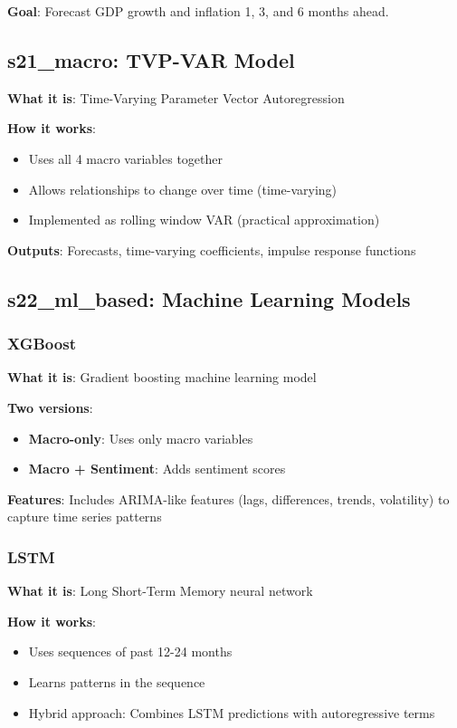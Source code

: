 \documentclass[11pt,a4paper]{article}
\begin{document}
\textbf{Goal}: Forecast GDP growth and inflation 1, 3, and 6 months ahead.

\subsection{s21\_macro: TVP-VAR Model}
\textbf{What it is}: Time-Varying Parameter Vector Autoregression

\textbf{How it works}:
\begin{itemize}
    \item Uses all 4 macro variables together
    \item Allows relationships to change over time (time-varying)
    \item Implemented as rolling window VAR (practical approximation)
\end{itemize}

\textbf{Outputs}: Forecasts, time-varying coefficients, impulse response functions

\subsection{s22\_ml\_based: Machine Learning Models}

\subsubsection{XGBoost}
\textbf{What it is}: Gradient boosting machine learning model

\textbf{Two versions}:
\begin{itemize}
    \item \textbf{Macro-only}: Uses only macro variables
    \item \textbf{Macro + Sentiment}: Adds sentiment scores
\end{itemize}

\textbf{Features}: Includes ARIMA-like features (lags, differences, trends, volatility) to capture time series patterns

\subsubsection{LSTM}
\textbf{What it is}: Long Short-Term Memory neural network

\textbf{How it works}:
\begin{itemize}
    \item Uses sequences of past 12-24 months
    \item Learns patterns in the sequence
    \item Hybrid approach: Combines LSTM predictions with autoregressive terms
\end{itemize}
\end{document}
